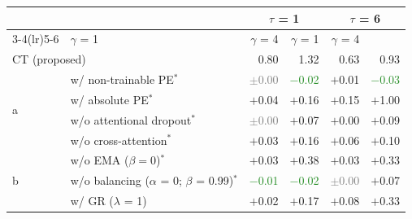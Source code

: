 \begin{tabular}{l|l|rr|rr}
\toprule
\multicolumn{2}{c|}{} & \multicolumn{2}{c|}{$\tau$ = 1} & \multicolumn{2}{c}{$\tau$ = 6} \\
\cmidrule(lr){3-4}\cmidrule(lr){5-6}
\multicolumn{2}{c|}{}  &            $\gamma$ = 1 &             $\gamma$ = 4 &            $\gamma$ = 1 &             $\gamma$ = 4 \\
\midrule

\multicolumn{2}{l|}{CT (proposed)} &                     0.80 &                     1.32 &                    0.63 &                     0.93 \\
\multirow{4}{*}{\textsf{a}} & w/ non-trainable PE$^*$                                  &   \textcolor{gray}{$\pm$0.00} &  \textcolor{ForestGreen}{$-$0.02} &  \textcolor{BrickRed}{$+$0.01} &  \textcolor{ForestGreen}{$-$0.03} \\
& w/ absolute PE$^*$                                       &  \textcolor{BrickRed}{$+$0.04} &   \textcolor{BrickRed}{$+$0.16} &  \textcolor{BrickRed}{$+$0.15} &    \textcolor{BrickRed}{$+$1.00} \\
& w/o attentional dropout$^*$                            &  \textcolor{gray}{$\pm$0.00} &   \textcolor{BrickRed}{$+$0.07} &   \textcolor{BrickRed}{$+$0.00} &   \textcolor{BrickRed}{$+$0.09} \\
\vspace{0.9mm}
& w/o cross-attention$^*$                                      &   \textcolor{BrickRed}{$+$0.03} &   \textcolor{BrickRed}{$+$0.16} &   \textcolor{BrickRed}{$+$0.06} &    \textcolor{BrickRed}{$+$0.10} \\

\multirow{3}{*}{\textsf{b}} & w/o EMA ($\beta = 0$)$^*$                                       &  \textcolor{BrickRed}{$+$0.03} &   \textcolor{BrickRed}{$+$0.38} &  \textcolor{BrickRed}{$+$0.03} &   \textcolor{BrickRed}{$+$0.33} \\
& w/o balancing ($\alpha$ = 0; $\beta$ = 0.99)$^*$                  &  \textcolor{ForestGreen}{$-$0.01} &  \textcolor{ForestGreen}{$-$0.02} &   \textcolor{gray}{$\pm$0.00} &   \textcolor{BrickRed}{$+$0.07} \\
\vspace{0.9mm}
& w/ GR ($\lambda$ = 1) &  \textcolor{BrickRed}{$+$0.02} &   \textcolor{BrickRed}{$+$0.17} &  \textcolor{BrickRed}{$+$0.08} &   \textcolor{BrickRed}{$+$0.33} \\


\end{tabular}
